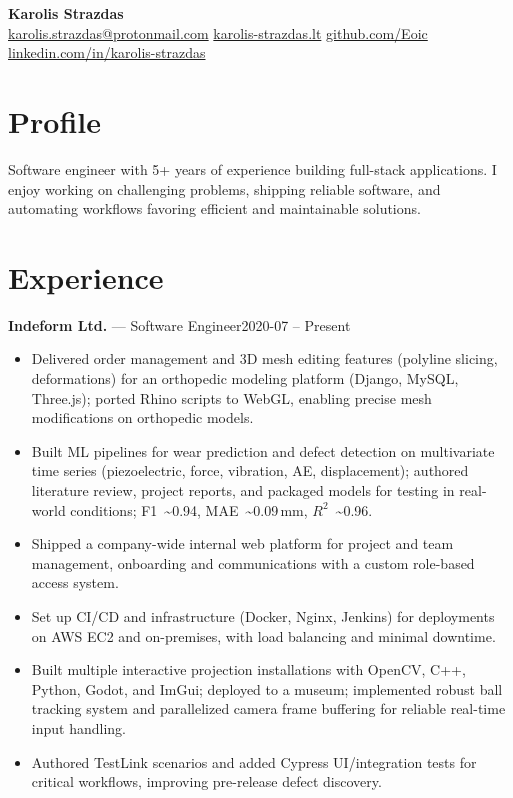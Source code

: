 \documentclass[10pt,a4paper]{article}
\makeatletter
\newcommand{\entry}[3]{\noindent\textbf{#1} — #2\hfill #3\\}
\newcommand{\Name}{Karolis Strazdas}
\newcommand{\Email}{karolis.strazdas@protonmail.com}
\newcommand{\Website}{https://karolis-strazdas.lt}
\newcommand{\GitHub}{https://github.com/Eoic}
\newcommand{\LinkedIn}{https://www.linkedin.com/in/karolis-strazdas/}
\makeatother
\begin{document}
\begin{center}
{\Huge\bfseries \Name}\\[0.8em]
\small \href{mailto:\Email}{\Email} \quad\textbullet\quad \href{\Website}{karolis-strazdas.lt} \quad\textbullet\quad \href{\GitHub}{github.com/Eoic} \quad\textbullet\quad \href{\LinkedIn}{linkedin.com/in/karolis-strazdas}
\end{center}

\vspace{-0.65em}

\begingroup\small

\section*{Profile}
Software engineer with 5+ years of experience building full-stack applications. I enjoy working on challenging problems, shipping reliable software, and automating workflows favoring efficient and maintainable solutions.

\section*{Experience}
\entry{Indeform Ltd.}{Software Engineer}{2020-07 -- Present}
\vspace{-0.8em}
\begin{itemize}[leftmargin=*,itemsep=0.0em,topsep=0.02em]
  \item Delivered order management and 3D mesh editing features (polyline slicing, deformations) for an orthopedic modeling platform (Django, MySQL, Three.js); ported Rhino scripts to WebGL, enabling precise mesh modifications on orthopedic models.
  \item Built ML pipelines for wear prediction and defect detection on multivariate time series (piezoelectric, force, vibration, AE, displacement); authored literature review, project reports, and packaged models for testing in real-world conditions; F1~\textasciitilde0.94, MAE~\textasciitilde0.09\,mm, $R^2$~\textasciitilde0.96.
  \item Shipped a company\mbox{-}wide internal web platform for project and team management, onboarding and communications with a custom role\mbox{-}based access system.
  \item Set up CI/CD and infrastructure (Docker, Nginx, Jenkins) for deployments on AWS EC2 and on\mbox{-}premises, with load balancing and minimal downtime.
  \item Built multiple interactive projection installations with OpenCV, C++, Python, Godot, and ImGui; deployed to a museum; implemented robust ball tracking system and parallelized camera frame buffering for reliable real-time input handling.
  \item Authored TestLink scenarios and added Cypress UI/integration tests for critical workflows, improving pre\mbox{-}release defect discovery.
\end{itemize}
\end{document}

